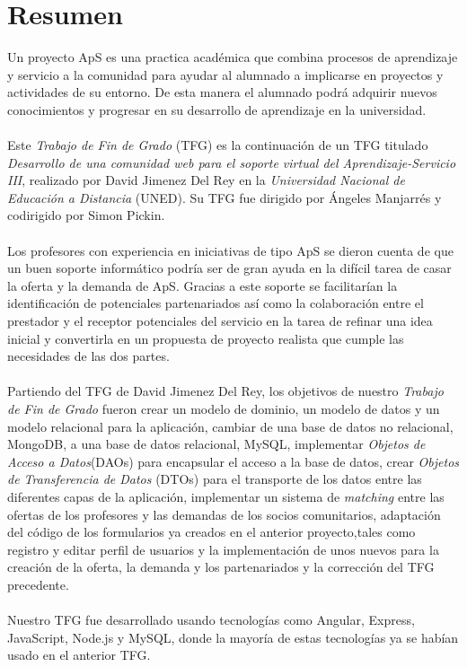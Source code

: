\documentclass[11pt]{book}
\begin{document}



\tableofcontents
\newpage
\listoffigures
\chapter*{Resumen} 
Un proyecto ApS es una practica académica que combina procesos de aprendizaje y servicio a la comunidad para ayudar al alumnado a implicarse en proyectos y actividades de su entorno. De esta manera el alumnado podrá adquirir nuevos conocimientos y progresar en su desarrollo de aprendizaje en la universidad.\\\\
Este \textit{Trabajo de Fin de Grado} (TFG) es la continuación de un TFG titulado \textit{Desarrollo de una comunidad web para el soporte virtual del Aprendizaje-Servicio III}, realizado por David Jimenez Del Rey en la \emph{Universidad Nacional de Educación a Distancia} (UNED). Su TFG fue dirigido por Ángeles Manjarrés y codirigido por Simon Pickin. \\\\
Los profesores con experiencia en iniciativas de tipo ApS se dieron cuenta de que un buen soporte informático podría ser de gran ayuda en la difícil tarea de casar la oferta y la demanda de ApS. Gracias a este soporte se facilitarían la identificación de potenciales partenariados así como la colaboración entre el prestador y el receptor potenciales del servicio en la tarea de refinar una idea inicial y convertirla en un propuesta de proyecto realista que cumple las necesidades de las dos partes.\\\\ 
Partiendo del TFG de David Jimenez Del Rey, los objetivos de nuestro \textit{Trabajo de Fin de Grado} fueron crear un modelo de dominio, un modelo de datos y un modelo relacional para la aplicación, cambiar de una base de datos no relacional, MongoDB, a una base de datos relacional, MySQL, implementar \emph{Objetos de Acceso a Datos}(DAOs) para encapsular el acceso a la base de datos, crear \emph{Objetos de Transferencia de Datos} (DTOs) para el transporte de los datos entre las diferentes capas de la aplicación, implementar un sistema de \textit{matching} entre las ofertas de los profesores y las demandas de los socios comunitarios, adaptación del código de los formularios ya creados en el anterior proyecto,tales como registro  y editar perfil de usuarios y la implementación de unos nuevos para la creación  de la oferta, la demanda y los partenariados y la corrección del TFG precedente.\\\\
Nuestro TFG fue desarrollado usando tecnologías como Angular, Express, JavaScript, Node.js y MySQL, donde la mayoría de estas tecnologías ya se habían usado en el anterior TFG.\\\\
\end{document}
